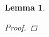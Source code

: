 \documentclass{article}
\newtheorem{lem}{Lemma}
\begin{document}
\begin{lem}
\begin{proof}

\end{proof}
\end{lem}
\end{document}
